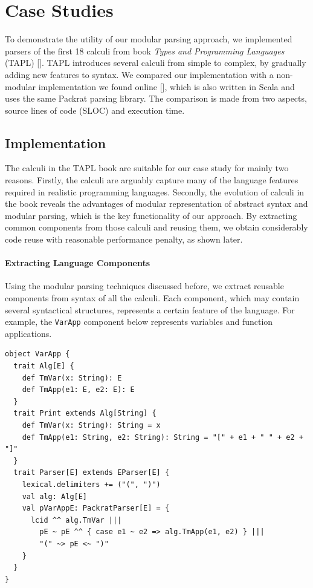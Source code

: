 \section{Case Studies}\label{sec:casestudy}


To demonstrate the utility of our modular parsing approach, we
implemented parsers of the first 18 calculi from book \textit{Types
  and Programming Languages} (TAPL) []. TAPL introduces several
calculi from simple to complex, by gradually adding new features to
syntax. We compared our implementation with a non-modular implementation we found online [], which is also written in Scala and uses the same Packrat parsing library. The comparison is made from two aspects, source lines of code (SLOC) and execution time. 

\subsection{Implementation}

The calculi in the TAPL book are suitable for our case study for mainly two reasons.
Firstly, the calculi are arguably capture many of the language features
required in realistic programming languages. Secondly, the evolution of
calculi in the book reveals the advantages of modular representation
of abstract syntax and modular parsing, which is the key functionality
of our approach. By extracting common components from those calculi
and reusing them, we obtain considerably code reuse with reasonable performance penalty, as shown later.

\paragraph{Extracting Language Components}
Using the modular parsing techniques discussed before, we extract
reusable components from syntax of all the calculi. Each
component, which may contain several syntactical structures,
represents a certain feature of the language. For
example, the \lstinline{VarApp} component below represents variables and
function applications.

\begin{lstlisting}
object VarApp {
  trait Alg[E] {
    def TmVar(x: String): E
    def TmApp(e1: E, e2: E): E
  }
  trait Print extends Alg[String] {
    def TmVar(x: String): String = x
    def TmApp(e1: String, e2: String): String = "[" + e1 + " " + e2 + "]"
  }
  trait Parser[E] extends EParser[E] {
    lexical.delimiters += ("(", ")")
    val alg: Alg[E]
    val pVarAppE: PackratParser[E] = {
      lcid ^^ alg.TmVar |||
        pE ~ pE ^^ { case e1 ~ e2 => alg.TmApp(e1, e2) } |||
        "(" ~> pE <~ ")"
    }
  }
}
\end{lstlisting}

